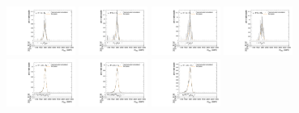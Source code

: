 \begin{figure}[htpb]
  \centering
  \includegraphics[width=0.2\textwidth]{fig/analysisAppendix/templateVsReco_ZprToWW2000_r0_MVV_mu_HP_bb_LDy_linear.pdf}
  \includegraphics[width=0.2\textwidth]{fig/analysisAppendix/templateVsReco_ZprToWW2000_r0_MVV_mu_LP_bb_LDy_linear.pdf}
  \includegraphics[width=0.2\textwidth]{fig/analysisAppendix/templateVsReco_ZprToWW2000_r0_MVV_mu_HP_bb_HDy_linear.pdf}
  \includegraphics[width=0.2\textwidth]{fig/analysisAppendix/templateVsReco_ZprToWW2000_r0_MVV_mu_LP_bb_HDy_linear.pdf}\\
  \includegraphics[width=0.2\textwidth]{fig/analysisAppendix/templateVsReco_ZprToWW2000_r0_MVV_mu_HP_nobb_LDy_linear.pdf}
  \includegraphics[width=0.2\textwidth]{fig/analysisAppendix/templateVsReco_ZprToWW2000_r0_MVV_mu_LP_nobb_LDy_linear.pdf}
  \includegraphics[width=0.2\textwidth]{fig/analysisAppendix/templateVsReco_ZprToWW2000_r0_MVV_mu_HP_nobb_HDy_linear.pdf}

\end{figure}
